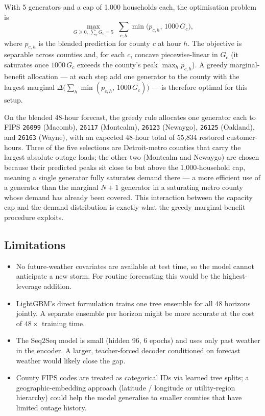 \documentclass[11pt]{article}
\begin{document}
With 5 generators and a cap of 1{,}000 households each, the optimisation
problem is
\[
\max_{G\ge 0,\,\sum_c G_c=5}\;\sum_{c,h}\min\bigl(p_{c,h},\,1000\,G_c\bigr),
\]
where $p_{c,h}$ is the blended prediction for county $c$ at hour $h$.
The objective is separable across counties and, for each $c$,
concave piecewise-linear in $G_c$ (it saturates once $1000\,G_c$
exceeds the county's peak $\max_h p_{c,h}$). A greedy
marginal-benefit allocation --- at each step add one generator to the
county with the largest marginal
$\Delta\!\bigl(\sum_h\min(p_{c,h},\,1000\,G_c)\bigr)$ --- is therefore
optimal for this setup.

On the blended 48-hour forecast, the greedy rule allocates one generator
each to FIPS \texttt{26099} (Macomb), \texttt{26117} (Montcalm),
\texttt{26123} (Newaygo), \texttt{26125} (Oakland), and
\texttt{26163} (Wayne), with an expected 48-hour total of 55{,}834
restored customer-hours. Three of the five selections are Detroit-metro
counties that carry the largest absolute outage loads; the other two
(Montcalm and Newaygo) are chosen because their predicted peaks
sit close to but above the 1{,}000-household cap, meaning a single
generator fully saturates demand there --- a more efficient use of a
generator than the marginal $N{+}1$ generator in a saturating metro
county whose demand has already been covered. This interaction between
the capacity cap and the demand distribution is exactly what the greedy
marginal-benefit procedure exploits.

\subsection{Limitations}

\begin{itemize}
  \item No future-weather covariates are available at test time, so the
        model cannot anticipate a new storm. For routine forecasting
        this would be the highest-leverage addition.
  \item LightGBM's direct formulation trains one tree ensemble for all
        48 horizons jointly. A separate ensemble per horizon might be
        more accurate at the cost of $48{\times}$ training time.
  \item The Seq2Seq model is small (hidden 96, 6 epochs) and uses only
        past weather in the encoder. A larger, teacher-forced decoder
        conditioned on forecast weather would likely close the gap.
  \item County FIPS codes are treated as categorical IDs via learned
        tree splits; a geographic-embedding approach (latitude /
        longitude or utility-region hierarchy) could help the model
        generalise to smaller counties that have limited outage history.
\end{itemize}
\end{document}
